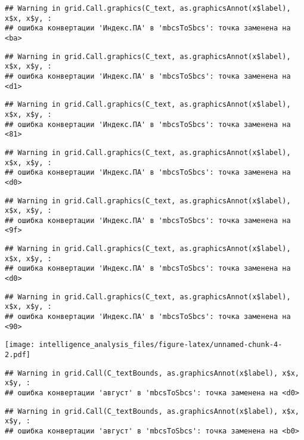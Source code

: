 \documentclass[
]{article}
\begin{document}
\begin{verbatim}
## Warning in grid.Call.graphics(C_text, as.graphicsAnnot(x$label), x$x, x$y, :
## ошибка конвертации 'Индекс.ПА' в 'mbcsToSbcs': точка заменена на <ba>
\end{verbatim}

\begin{verbatim}
## Warning in grid.Call.graphics(C_text, as.graphicsAnnot(x$label), x$x, x$y, :
## ошибка конвертации 'Индекс.ПА' в 'mbcsToSbcs': точка заменена на <d1>
\end{verbatim}

\begin{verbatim}
## Warning in grid.Call.graphics(C_text, as.graphicsAnnot(x$label), x$x, x$y, :
## ошибка конвертации 'Индекс.ПА' в 'mbcsToSbcs': точка заменена на <81>
\end{verbatim}

\begin{verbatim}
## Warning in grid.Call.graphics(C_text, as.graphicsAnnot(x$label), x$x, x$y, :
## ошибка конвертации 'Индекс.ПА' в 'mbcsToSbcs': точка заменена на <d0>
\end{verbatim}

\begin{verbatim}
## Warning in grid.Call.graphics(C_text, as.graphicsAnnot(x$label), x$x, x$y, :
## ошибка конвертации 'Индекс.ПА' в 'mbcsToSbcs': точка заменена на <9f>
\end{verbatim}

\begin{verbatim}
## Warning in grid.Call.graphics(C_text, as.graphicsAnnot(x$label), x$x, x$y, :
## ошибка конвертации 'Индекс.ПА' в 'mbcsToSbcs': точка заменена на <d0>
\end{verbatim}

\begin{verbatim}
## Warning in grid.Call.graphics(C_text, as.graphicsAnnot(x$label), x$x, x$y, :
## ошибка конвертации 'Индекс.ПА' в 'mbcsToSbcs': точка заменена на <90>
\end{verbatim}

\texttt{[image: intelligence\_analysis\_files/figure-latex/unnamed-chunk-4-2.pdf]}

\begin{verbatim}
## Warning in grid.Call(C_textBounds, as.graphicsAnnot(x$label), x$x, x$y, :
## ошибка конвертации 'август' в 'mbcsToSbcs': точка заменена на <d0>
\end{verbatim}

\begin{verbatim}
## Warning in grid.Call(C_textBounds, as.graphicsAnnot(x$label), x$x, x$y, :
## ошибка конвертации 'август' в 'mbcsToSbcs': точка заменена на <b0>
\end{verbatim}
\end{document}
